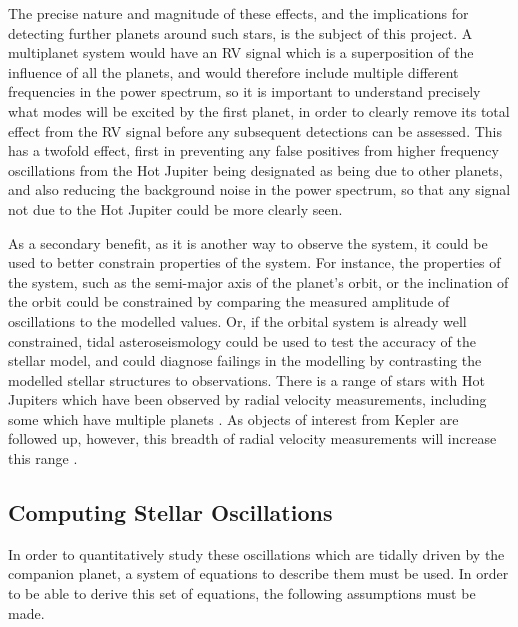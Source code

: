\documentclass[11pt]{amsart}
\begin{document}
The precise nature and magnitude of these effects, and the implications for detecting further planets around such stars, is the subject of this project.  A multiplanet system would have an RV signal which is a superposition of the influence of all the planets, and would therefore include multiple different frequencies in the power spectrum, so it is important to understand precisely what modes will be excited by the first planet, in order to clearly remove its total effect from the RV signal before any subsequent detections can be assessed.  This has a twofold effect, first in preventing any false positives from higher frequency oscillations from the Hot Jupiter being designated as being due to other planets, and also reducing the background noise in the power spectrum, so that any signal not due to the Hot Jupiter could be more clearly seen.

As a secondary benefit, as it is another way to observe the system, it could be used to better constrain properties of the system.  For instance, the properties of the system, such as the semi-major axis of the planet's orbit, or the inclination of the orbit could be constrained by comparing the measured amplitude of oscillations to the modelled values.  Or, if the orbital system is already well constrained, tidal asteroseismology could be used to test the accuracy of the stellar model, and could diagnose failings in the modelling by contrasting the modelled stellar structures to observations.  There is a range of stars with Hot Jupiters which have been observed by radial velocity measurements, including some which have multiple planets \cite{NASAExoplanet}.  As objects of interest from Kepler are followed up, however, this  breadth of radial velocity measurements will increase this range \cite{Crouzet2017}.




\subsection{Computing Stellar Oscillations} \label{Intro:StellarOsc}

In order to quantitatively study these oscillations which are tidally driven by the companion planet, a system of equations to describe them must be used.  In order to be able to derive this set of equations, the following assumptions must be made.
\end{document}
